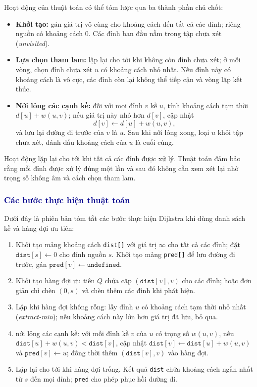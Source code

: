 \documentclass[14pt,a4paper]{report}
\begin{document}
Hoạt động của thuật toán có thể tóm lược qua ba thành phần chủ chốt:
\begin{itemize}
    \item \textbf{Khởi tạo:} gán giá trị vô cùng cho khoảng cách đến tất cả các đỉnh; riêng nguồn có khoảng cách $0$. Các đỉnh ban đầu nằm trong tập chưa xét (\textit{unvisited}).
    \item \textbf{Lựa chọn tham lam:} lặp lại cho tới khi không còn đỉnh chưa xét; ở mỗi vòng, chọn đỉnh chưa xét $u$ có khoảng cách nhỏ nhất. Nếu đỉnh này có khoảng cách là vô cực, các đỉnh còn lại không thể tiếp cận và vòng lặp kết thúc.
    \item \textbf{Nới lỏng  các cạnh kề:} đối với mọi đỉnh $v$ kề $u$, tính khoảng cách tạm thời $d[u] + w(u,v)$; nếu giá trị này nhỏ hơn $d[v]$, cập nhật
    \[
        d[v] \leftarrow d[u] + w(u,v),
    \]
    và lưu lại đường đi trước của $v$ là $u$. Sau khi nới lỏng  xong, loại $u$ khỏi tập chưa xét, đánh dấu khoảng cách của $u$ là cuối cùng.
\end{itemize}

Hoạt động lặp lại cho tới khi tất cả các đỉnh được xử lý. Thuật toán đảm bảo rằng mỗi đỉnh được xử lý đúng một lần và sau đó không cần xem xét lại nhờ trọng số không âm và cách chọn tham lam.

\subsubsection{\textcolor{darkblue}{Các bước thực hiện thuật toán}}
Dưới đây là phiên bản tóm tắt các bước thực hiện Dijkstra khi dùng danh sách kề và hàng đợi ưu tiên:
\begin{enumerate}
    \item Khởi tạo mảng khoảng cách \texttt{dist[]} với giá trị $\infty$ cho tất cả các đỉnh; đặt $\texttt{dist}[s] \leftarrow 0$ cho đỉnh nguồn $s$. Khởi tạo mảng \texttt{pred[]} để lưu đường đi trước, gán $\texttt{pred}[v] \leftarrow \texttt{undefined}$.
    \item Khởi tạo hàng đợi ưu tiên $Q$ chứa cặp $(\texttt{dist}[v], v)$ cho các đỉnh; hoặc đơn giản chỉ chèn $(0,s)$ và chèn thêm các đỉnh khi phát hiện.
    \item Lặp khi hàng đợi không rỗng: lấy đỉnh $u$ có khoảng cách tạm thời nhỏ nhất (\textit{extract-min}); nếu khoảng cách này lớn hơn giá trị đã lưu, bỏ qua.
    \item nới lỏng  các cạnh kề: với mỗi đỉnh kề $v$ của $u$ có trọng số $w(u,v)$, nếu $\texttt{dist}[u] + w(u,v) < \texttt{dist}[v]$, cập nhật
    $\texttt{dist}[v] \leftarrow \texttt{dist}[u] + w(u,v)$ và $\texttt{pred}[v] \leftarrow u$; đồng thời thêm $(\texttt{dist}[v], v)$ vào hàng đợi.
    \item Lặp lại cho tới khi hàng đợi trống. Kết quả \texttt{dist} chứa khoảng cách ngắn nhất từ $s$ đến mọi đỉnh; \texttt{pred} cho phép phục hồi đường đi.
\end{enumerate}
\end{document}
